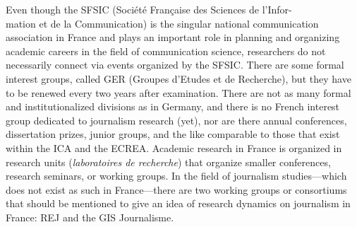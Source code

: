 \documentclass{tufte-handout}
\begin{document}
Even though the SFSIC (Société Française des Sciences de l'Infor-\\\noindent mation
et de la Communication) is the singular national communication
association in France and plays an important role in planning and
organizing academic careers in the field of communication science,
researchers do not necessarily connect via events organized by the
SFSIC. There are some formal interest groups, called GER (Groupes
d'Etudes et de Recherche), but they have to be renewed every two years
after examination. There are not as many formal and institutionalized
divisions as in Germany, and there is no French interest group dedicated
to journalism research (yet), nor are there annual conferences,
dissertation prizes, junior groups, and the like comparable to those
that exist within the ICA and the ECREA. Academic research in France is
organized in research units (\emph{laboratoires de recherche}) that
organize smaller conferences, research seminars, or working groups. In
the field of journalism studies---which does not exist as such in
France---there are two working groups or consortiums that should be
mentioned to give an idea of research dynamics on journalism in France:
REJ and the GIS Journalisme.
\end{document}
